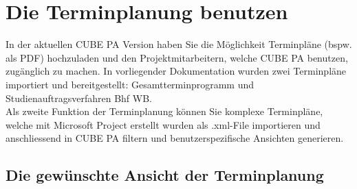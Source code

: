
\pagebreak	
\section{Die Terminplanung benutzen}
\label{bkm:Ref445400921}
In der aktuellen CUBE PA Version haben Sie die Möglichkeit Terminpläne (bspw. als PDF) hochzuladen und den Projektmitarbeitern, welche CUBE PA benutzen, zugänglich zu machen. In vorliegender Dokumentation wurden zwei Terminpläne importiert und bereitgestellt: Gesamtterminprogramm und Studienauftragsverfahren Bhf WB. \\
Als zweite Funktion der Terminplanung können Sie komplexe Terminpläne, welche mit Microsoft Project erstellt wurden als .xml-File importieren und anschliessend in CUBE PA filtern und benutzerspezifische Ansichten generieren.


\subsection{Die gewünschte Ansicht der Terminplanung}


